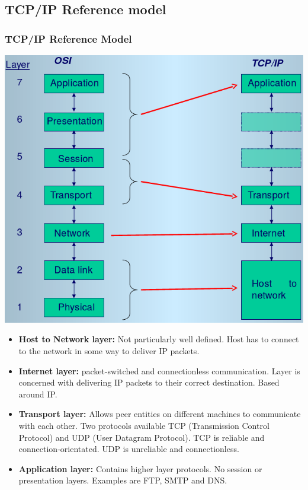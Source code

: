 \documentclass{beamer}
\begin{document}
\subsection{TCP/IP Reference model}
\begin{frame}[allowframebreaks]
\frametitle{TCP/IP Reference Model}
\includegraphics[scale=0.35]{tcp.png}
\begin{itemize}
\item \textbf{Host to Network layer:} Not particularly well defined. Host has to connect to the network in some way to deliver IP packets.
\item \textbf{Internet layer:} packet-switched and connectionless communication. Layer is concerned with delivering IP packets to their correct destination. Based around IP.
\item \textbf{Transport layer:} Allows peer entities on different machines to communicate with each other. Two protocols available TCP (Transmission Control Protocol) and UDP (User Datagram Protocol). TCP is reliable and connection-orientated. UDP is unreliable and connectionless.
\item \textbf{Application layer:} Contains higher layer protocols. No session or presentation layers. Examples are FTP, SMTP and  DNS.
\end{itemize}
\end{frame}
\end{document}

